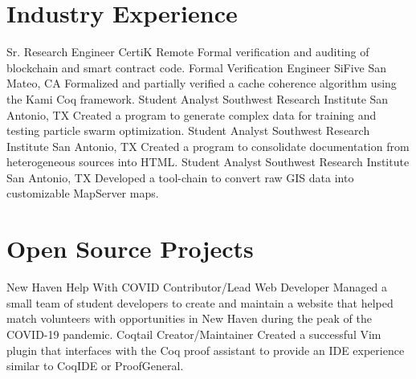 \documentclass[10pt,letterpaper,sans]{moderncv}
\begin{document}
\section{Industry Experience}

        {Sr. Research Engineer}
        {CertiK}
        {Remote}
        {}
        {%
          Formal verification and auditing of blockchain and smart contract code.
        }
        {Formal Verification Engineer}
        {SiFive}
        {San Mateo, CA}
        {}
        {%
          Formalized and partially verified a cache coherence algorithm using
          the Kami Coq framework.
        }
        {Student Analyst}
        {Southwest Research Institute}
        {San Antonio, TX}
        {}
        {%
          Created a program to generate complex data for training and testing
          particle swarm optimization.
        }
        {Student Analyst}
        {Southwest Research Institute}
        {San Antonio, TX}
        {}
        {%
          Created a program to consolidate documentation from heterogeneous
          sources into HTML\@.
        }
        {Student Analyst}
        {Southwest Research Institute}
        {San Antonio, TX}
        {}
        {%
          Developed a tool-chain to convert raw GIS data into customizable
          MapServer maps.
        }

\section{Open Source Projects}

        {New Haven Help With COVID}
        {Contributor/Lead Web Developer}
        {
        }
        {}
        {%
          Managed a small team of student developers to create and maintain a
          website that helped match volunteers with opportunities in New Haven
          during the peak of the COVID-19 pandemic.
        }
        {Coqtail}
        {Creator/Maintainer}
        {}
        {}
        {%
          Created a successful Vim plugin that interfaces with the Coq proof
          assistant to provide an IDE experience similar to CoqIDE or ProofGeneral.
        }
\end{document}
